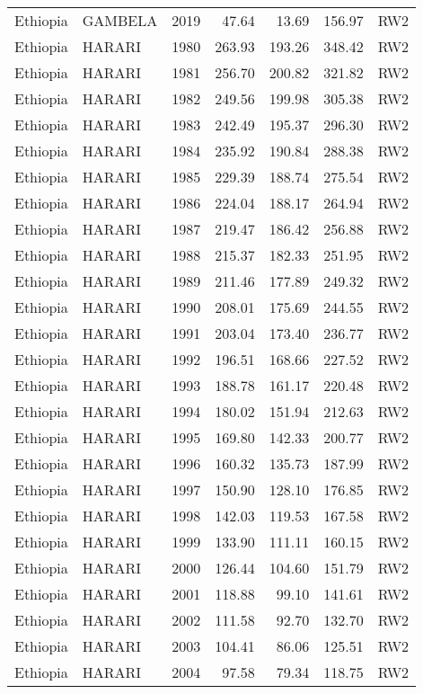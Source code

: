 \begin{longtable}{lllrrrl}
  Ethiopia & GAMBELA & 2019 & 47.64 & 13.69 & 156.97 & RW2 \\ 
  Ethiopia & HARARI & 1980 & 263.93 & 193.26 & 348.42 & RW2 \\ 
  Ethiopia & HARARI & 1981 & 256.70 & 200.82 & 321.82 & RW2 \\ 
  Ethiopia & HARARI & 1982 & 249.56 & 199.98 & 305.38 & RW2 \\ 
  Ethiopia & HARARI & 1983 & 242.49 & 195.37 & 296.30 & RW2 \\ 
  Ethiopia & HARARI & 1984 & 235.92 & 190.84 & 288.38 & RW2 \\ 
  Ethiopia & HARARI & 1985 & 229.39 & 188.74 & 275.54 & RW2 \\ 
  Ethiopia & HARARI & 1986 & 224.04 & 188.17 & 264.94 & RW2 \\ 
  Ethiopia & HARARI & 1987 & 219.47 & 186.42 & 256.88 & RW2 \\ 
  Ethiopia & HARARI & 1988 & 215.37 & 182.33 & 251.95 & RW2 \\ 
  Ethiopia & HARARI & 1989 & 211.46 & 177.89 & 249.32 & RW2 \\ 
  Ethiopia & HARARI & 1990 & 208.01 & 175.69 & 244.55 & RW2 \\ 
  Ethiopia & HARARI & 1991 & 203.04 & 173.40 & 236.77 & RW2 \\ 
  Ethiopia & HARARI & 1992 & 196.51 & 168.66 & 227.52 & RW2 \\ 
  Ethiopia & HARARI & 1993 & 188.78 & 161.17 & 220.48 & RW2 \\ 
  Ethiopia & HARARI & 1994 & 180.02 & 151.94 & 212.63 & RW2 \\ 
  Ethiopia & HARARI & 1995 & 169.80 & 142.33 & 200.77 & RW2 \\ 
  Ethiopia & HARARI & 1996 & 160.32 & 135.73 & 187.99 & RW2 \\ 
  Ethiopia & HARARI & 1997 & 150.90 & 128.10 & 176.85 & RW2 \\ 
  Ethiopia & HARARI & 1998 & 142.03 & 119.53 & 167.58 & RW2 \\ 
  Ethiopia & HARARI & 1999 & 133.90 & 111.11 & 160.15 & RW2 \\ 
  Ethiopia & HARARI & 2000 & 126.44 & 104.60 & 151.79 & RW2 \\ 
  Ethiopia & HARARI & 2001 & 118.88 & 99.10 & 141.61 & RW2 \\ 
  Ethiopia & HARARI & 2002 & 111.58 & 92.70 & 132.70 & RW2 \\ 
  Ethiopia & HARARI & 2003 & 104.41 & 86.06 & 125.51 & RW2 \\ 
  Ethiopia & HARARI & 2004 & 97.58 & 79.34 & 118.75 & RW2 \\ 

\end{longtable}

